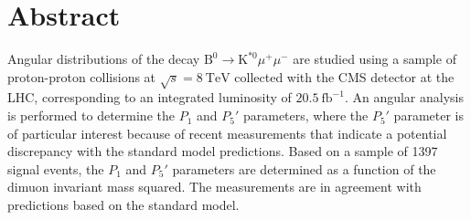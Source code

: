 \chapter*{Abstract}
 Angular distributions of the decay $\mathrm{B}^0 \to \mathrm{K}^{*0} \mu^ +\mu^-$ are studied using a sample of proton-proton collisions at $\sqrt{s}=8~\mathrm{TeV}$
 collected with the CMS detector at the LHC, corresponding to an integrated luminosity of $20.5~\mathrm{fb}^{-1}$.
 An angular analysis is performed to determine the $P_1$ and $P_5'$ parameters, where the $P_5'$ parameter is of particular interest because of recent measurements
 that indicate a potential discrepancy with the standard model predictions. Based on a sample of 1397 signal events, the $P_1$ and $P_5'$ parameters are determined
 as a function of the dimuon invariant mass squared. The measurements are in agreement with predictions based on the standard model.
